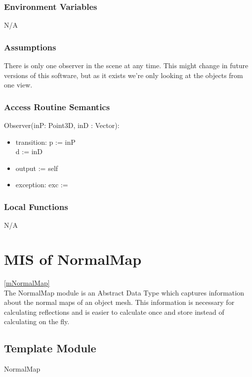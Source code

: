 \documentclass[12pt, titlepage]{article}
\begin{document}
\subsubsection{Environment Variables}
N/A

\subsubsection{Assumptions}
There is only one observer in the scene at any time. This might change in 
future versions of this software, but as it exists we're only looking at the 
objects from one view.

\subsubsection{Access Routine Semantics}
\noindent Observer(inP: Point3D, inD : Vector):
\begin{itemize}
	\item transition: p := inP \\
	d := inD
	\item output := self
	\item exception: exc :=
\end{itemize}

\subsubsection{Local Functions}
N/A

\newpage

\section{MIS of NormalMap} \ref{mNormalMap} \\
The NormalMap module is an Abstract Data Type which captures information about 
the normal maps of an object mesh. This information is necessary for 
calculating reflections and is easier to calculate once and store instead of 
calculating on the fly.

\subsection{Template Module}
NormalMap
\end{document}
